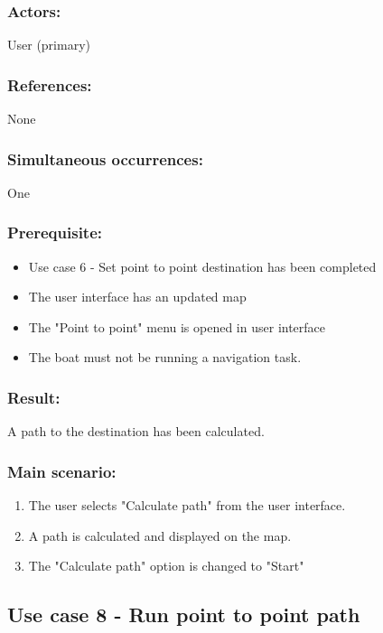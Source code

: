 \subsubsection*{Actors:}
User (primary)

\subsubsection*{References:}
None

\subsubsection*{Simultaneous occurrences:}
One 

\subsubsection*{Prerequisite:}
\begin{itemize}
	\item Use case 6 - Set point to point destination has been completed
	\item The user interface has an updated map
	\item The "Point to point" menu is opened in user interface
	\item The boat must not be running a navigation task.
\end{itemize}

\subsubsection*{Result:}
A path to the destination has been calculated.

\subsubsection*{Main scenario:}
\begin{enumerate}
	\item The user selects "Calculate path" from the user interface.
	\item A path is calculated and displayed on the map. 
	\item The "Calculate path" option is changed to "Start"
\end{enumerate}	


\subsection{Use case 8 - Run point to point path}
